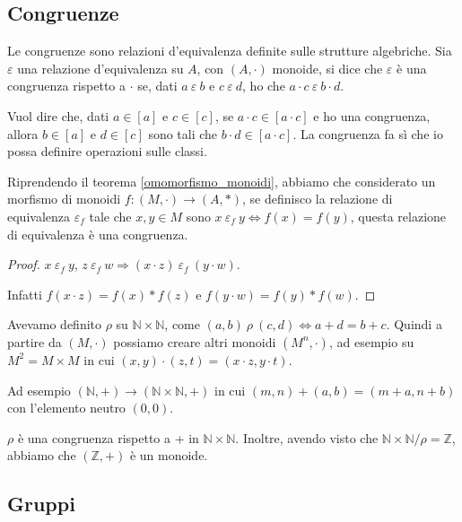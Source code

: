 \subsection{Congruenze\label{congruenze}}

\begin{defn}
Le congruenze sono relazioni d'equivalenza definite sulle strutture algebriche. Sia $\varepsilon$ una relazione d'equivalenza su $A$, con $(A, \cdot)$ monoide, si dice che $\varepsilon$ \`e una congruenza rispetto a $\cdot$ se, dati $a \ \varepsilon \ b$ e $c \ \varepsilon \ d$, ho che $a \cdot c \ \varepsilon \ b \cdot d$.
\end{defn}

Vuol dire che, dati $a \in [a]$ e $c \in [c]$, se $a \cdot c \in [a \cdot c]$ e ho una congruenza, allora $b \in [a]$ e $d \in [c]$ sono tali che $b \cdot d \in [a \cdot c]$. La congruenza fa s\`i che io possa definire operazioni sulle classi.

\begin{prop}
Riprendendo il teorema \ref{omomorfismo_monoidi}, abbiamo che considerato un morfismo di monoidi $f : (M, \cdot) \to (A, \ast)$, se definisco la relazione di equivalenza $\varepsilon_f$ tale che $x, y \in M$ sono $x \ \varepsilon_f \ y \Leftrightarrow f(x) = f(y)$, questa relazione di equivalenza \`e una congruenza.
\end{prop}
\begin{proof}\label{congruenza_monoidi}
$x \ \varepsilon_f \ y$, $z \ \varepsilon_f \ w \Rightarrow (x \cdot z) \ \varepsilon_f \ (y \cdot w)$.

Infatti $f(x \cdot z) = f(x) \ast f(z)$ e $f(y \cdot w) = f(y) \ast f(w)$. 
\end{proof}

Avevamo definito $\rho$ su $\mathbb{N} \times \mathbb{N}$, come $(a, b) \ \rho \ (c, d) \Leftrightarrow a+d = b+c$. Quindi a partire da $(M, \cdot) $ possiamo creare altri monoidi $(M^n, \cdot)$, ad esempio su $M^2 = M \times M$ in cui $(x, y) \cdot (z, t) = (x \cdot z, y \cdot t)$.

Ad esempio $(\mathbb{N}, +) \to (\mathbb{N} \times \mathbb{N}, +)$ in cui $(m, n) + (a, b) = (m+a, n+b)$ con l'elemento neutro $(0,0)$.

$\rho$ \`e una congruenza rispetto a + in $\mathbb{N} \times \mathbb{N}$. Inoltre, avendo visto che $\mathbb{N} \times \mathbb{N} / \rho = \mathbb{Z}$, abbiamo che $(\mathbb{Z}, +)$ \`e un monoide.

\subsection{Gruppi}

